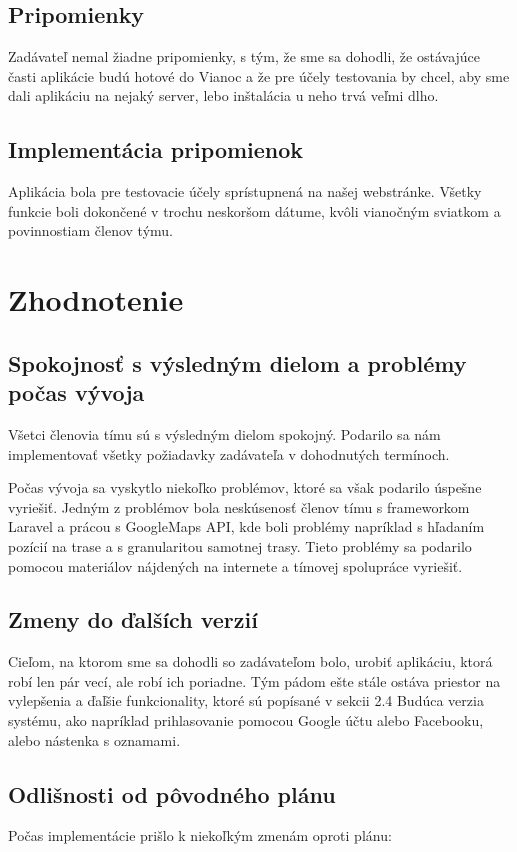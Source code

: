 \documentclass[12pt,a4paper]{report}
\theoremstyle{definition}
\theoremstyle{remark}
\begin{document}
\section{Pripomienky}
Zadávateľ nemal žiadne pripomienky, s tým, že sme sa dohodli, že ostávajúce časti aplikácie budú hotové do Vianoc a že pre účely testovania by chcel, aby sme dali aplikáciu na nejaký server, lebo inštalácia u neho trvá veľmi dlho.

\section{Implementácia pripomienok}
Aplikácia bola pre testovacie účely sprístupnená na našej webstránke. Všetky funkcie boli dokončené v trochu neskoršom dátume, kvôli vianočným sviatkom a povinnostiam členov týmu.

\chapter{Zhodnotenie}
\section{Spokojnosť s výsledným dielom a problémy počas vývoja}
Všetci členovia tímu sú s výsledným dielom spokojný. Podarilo sa nám implementovať
všetky požiadavky zadávateľa v dohodnutých termínoch.

Počas vývoja sa vyskytlo niekoľko problémov, ktoré sa však podarilo úspešne vyriešiť.
Jedným z problémov bola neskúsenosť členov tímu s frameworkom Laravel a prácou s GoogleMaps API, kde boli problémy napríklad s hľadaním pozícií na trase a s granularitou samotnej trasy. Tieto problémy sa podarilo pomocou materiálov nájdených na internete a tímovej spolupráce vyriešiť.

\section{Zmeny do ďalších verzií}
Cieľom, na ktorom sme sa dohodli so zadávateľom bolo, urobiť aplikáciu, ktorá robí len pár vecí, ale robí ich poriadne. Tým pádom ešte stále ostáva priestor na vylepšenia a ďaľšie funkcionality, ktoré sú popísané v sekcii 2.4 Budúca verzia systému, ako napríklad prihlasovanie pomocou Google účtu alebo Facebooku, alebo nástenka s oznamami.

\section{Odlišnosti od pôvodného plánu}
Počas implementácie prišlo k niekoľkým zmenám oproti plánu:
\end{document}
